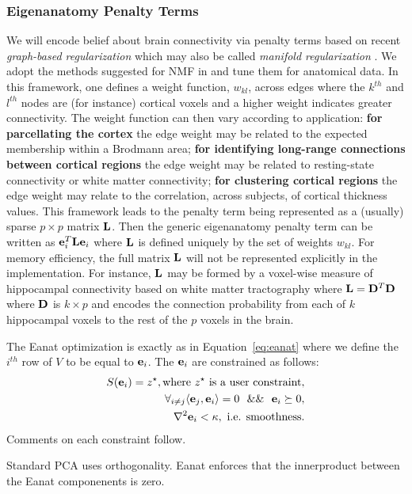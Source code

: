 \documentclass{elsarticle}\usepackage{graphicx, color}
\begin{document}
\subsubsection{Eigenanatomy Penalty Terms} 
We will encode belief about brain connectivity via penalty terms based on recent {\em graph-based regularization} which may also be called {\em manifold regularization} \cite{Guan2011,Cai2010,Hosoda2009}.  We adopt the methods suggested for NMF in \cite{Cai2010,Guan2011} and tune them for anatomical data.  In this framework, one defines a weight function, $w_{kl}$, across edges where the $k^{th}$ and $l^{th}$ nodes are (for instance) cortical voxels and a higher weight indicates greater connectivity.  The weight function can then vary according to application:  {\bf for parcellating the cortex} the edge weight may be related to the expected membership within a Brodmann area;  {\bf for identifying long-range connections between cortical regions} the edge weight may be related to resting-state connectivity or white matter connectivity;  {\bf for clustering cortical regions} the edge weight may relate to the correlation, across subjects, of cortical thickness values.  This framework leads to the penalty term being represented as a (usually) sparse $p \times p$ matrix ${\bf L}$.  Then the generic eigenanatomy penalty term can be written as ${\bf e}_i^T {\bf L} {\bf e}_i$ where ${\bf L}$ is defined uniquely by the set of weights $w_{kl}$.  For memory efficiency, the full matrix ${\bf L}$ will not be represented explicitly in the implementation.  {For instance, ${\bf L}$ may be formed by a voxel-wise measure of hippocampal connectivity based on white matter tractography where ${\bf L} = {\bf D}^T {\bf D}$ where ${\bf D}$ is $k \times p$ and encodes the connection probability from each of $k$ hippocampal voxels to the rest of the $p$ voxels in the brain.}

The Eanat optimization is exactly as in Equation~\ref{eq:eanat} where
we define the $i^{th}$ row of $V$ to be equal to ${\bf e}_i$.
The ${\bf e}_i$ are constrained as follows:
\begin{eqnarray}
S( {\bf e}_i ) = z^\star, \text{where $z^\star$ is a user constraint},\\ \notag
\forall_{i \ne j} \langle {\bf e}_j ,  {\bf e}_i \rangle = 0~~\&\&~~{\bf e}_i \succeq 0,\\ \notag
\nabla^2 {\bf e}_i < \kappa, \text{ i.e. smoothness}.
\end{eqnarray}
Comments on each constraint follow.

 Standard PCA uses orthogonality.  Eanat
enforces that the innerproduct between the Eanat componenents is
zero.  
  
\end{document}
